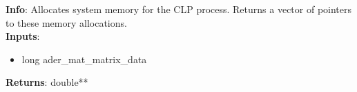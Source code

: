 \textbf{Info}: Allocates system memory for the CLP process. Returns a vector
of pointers to these memory allocations. \\

\noindent \textbf{Inputs}:
\begin{itemize}
\item{long ader\_mat\_matrix\_data}
\end{itemize}

\noindent \textbf{Returns}: double**
